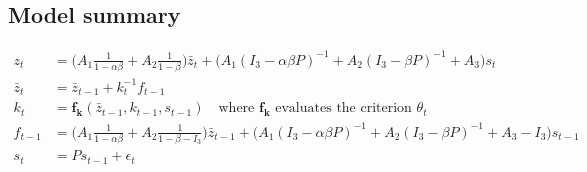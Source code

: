 \documentclass[11pt]{article}
\renewcommand{\[}{\begin{equation}}
\renewcommand{\]}{\end{equation}}
\begin{document}
\subsection{Model summary}
\begin{align}
z_t & = \bigg(A_1\frac{1}{1-\alpha\beta} +A_2\frac{1}{1-\beta}\bigg)\bar{z}_t + \bigg(A_1(I_3 - \alpha\beta P)^{-1} +A_2(I_3 - \beta P)^{-1} +A_3\bigg)s_t \tag{ALM} \\
\bar{z}_t & = \bar{z}_{t-1} + k_t^{-1} f_{t-1} \tag{Drift LOM}\\
k_t & = \mathbf{f_k}(\bar{z}_{t-1}, k_{t-1}, s_{t-1})  \quad \text{where $\mathbf{f_k}$ evaluates the criterion $\theta_t$}\tag{Gain LOM} \\
f_{t-1} & = \bigg(A_1\frac{1}{1-\alpha\beta} +A_2\frac{1}{1-\beta -I_3}\bigg)\bar{z}_{t-1} + \bigg(A_1(I_3 - \alpha\beta P)^{-1} +A_2(I_3 - \beta P)^{-1} +A_3 -I_3\bigg)s_{t-1} \\
s_t &= Ps_{t-1} +\epsilon_t \tag{exog. process}
\end{align}

	



 
 
\end{document}
